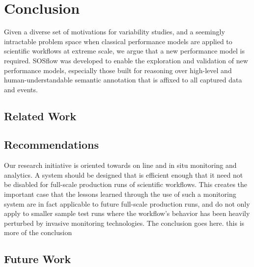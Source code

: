 

\section{Conclusion}
Given a diverse set of motivations for variability studies, and a seemingly
intractable problem space when classical performance models are applied to
scientific workflows at extreme scale, we argue that a new performance model is
required. SOSflow was developed to enable the exploration and validation of new
performance models, especially those built for reasoning over high-level and
human-understandable semantic annotation that is affixed to all captured data and
events.
\subsection{Related Work}
\subsection{Recommendations}
Our research initiative is oriented towards on line and in
situ monitoring and  analytics. A system should be designed that is efficient
enough that it need not
be disabled for full-scale production runs of scientific workflows. This creates
the important case that the lessons learned through the use of such a
monitoring system are in fact applicable to future full-scale production runs,
and do not only apply to smaller sample test runs where the workflow's behavior
has been heavily perturbed by invasive monitoring technologies.
The conclusion goes here. this is more of the conclusion
\subsection{Future Work}

